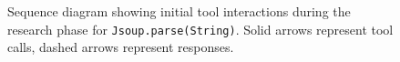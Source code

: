 \begin{figure}[t]
\centering

\caption{Sequence diagram showing initial tool interactions during the research phase for \texttt{Jsoup.parse(String)}. Solid arrows represent tool calls, dashed arrows represent responses.}
\label{fig:research-sequence}
\end{figure}